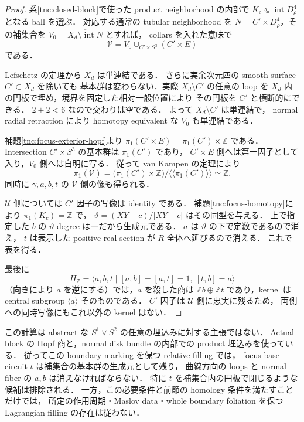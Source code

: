 \begin{proof}
系\ref{tnc:closed-block}で使った product neighborhood の内部で
$K_c\Subset\operatorname{int}D^4_\rho$ となる ball を選ぶ．
対応する通常の tubular neighborhood を
$N=C'\times D^4_\rho$，その補集合を
$V_0=\overline{X_d\setminus\operatorname{int}N}$ とすれば，
collars を入れた意味で
\[
 \mathcal V=V_0\cup_{C'\times S^3}(C'\times E)
\]
である．

Lefschetz の定理から $X_d$ は単連結である．
さらに実余次元四の smooth surface $C'\subset X_d$ を除いても
基本群は変わらない．実際 $X_d\setminus C'$ の任意の loop を
$X_d$ 内の円板で埋め，境界を固定した相対一般位置により
その円板を $C'$ と横断的にできる．
$2+2<6$ なので交わりは空である．
よって $X_d\setminus C'$ は単連結で，
normal radial retraction により homotopy equivalent な $V_0$ も単連結である．

補題\ref{tnc:focus-exterior-hopf}より
$\pi_1(C'\times E)=\pi_1(C')\times\mathbb Z$ である．
Intersection $C'\times S^3$ の基本群は $\pi_1(C')$ であり，
$C'\times E$ 側へは第一因子として入り，$V_0$ 側へは自明に写る．
従って van Kampen の定理により
\[
 \pi_1(\mathcal V)
 =\bigl(\pi_1(C')\times\mathbb Z\bigr)
      /\langle\!\langle\pi_1(C')\rangle\!\rangle
 \simeq\mathbb Z.
\]
同時に $\gamma,a,b,t$ の $\mathcal V$ 側の像も得られる．

$\mathcal U$ 側については $C'$ 因子の写像は identity である．
補題\ref{tnc:focus-homotopy}により $\pi_1(K_c)=\mathbb Z$ で，
$\vartheta=(XY-c)/|XY-c|$ はその同型を与える．
上で指定した $b$ の $\vartheta$-degree は一だから生成元である．
$a$ は $\vartheta$ の下で定数であるので消え，
$t$ は表示した positive-real section が $R$ 全体へ延びるので消える．
これで表を得る．

最後に
\[
 H_{\mathbb Z}
 =\langle a,b,t\mid[a,b]=[a,t]=1,\ [t,b]=a\rangle
\]
（向きにより $a$ を逆にする）では，$a$ を殺した商は
$\mathbb Z b\oplus\mathbb Z t$ であり，kernel は
central subgroup $\langle a\rangle$ そのものである．
$C'$ 因子は $\mathcal U$ 側に忠実に残るため，
両側への同時写像にもこれ以外の kernel はない．
\end{proof}

\begin{remark}
\label{tnc:pi1-filling-constraint}
この計算は abstract な $S^1\vee S^2$ の任意の埋込みに対する主張ではない．
Actual block の Hopf 商と，normal disk bundle の内部での product 埋込みを使っている．
従ってこの boundary marking を保つ relative filling では，
focus base circuit $t$ は補集合の基本群の生成元として残り，
曲線方向の loops と normal fiber の $a,b$ は消えなければならない．
特に $t$ を補集合内の円板で閉じるような候補は排除される．
一方，この必要条件と前節の homology 条件を満たすことだけでは，
所定の作用周期・Maslov data・whole boundary foliation を保つ
Lagrangian filling の存在は従わない．
\end{remark}

